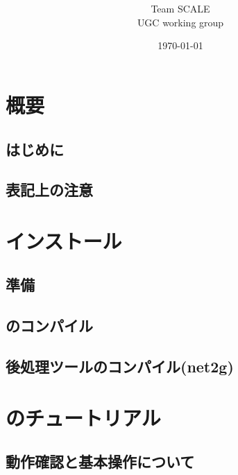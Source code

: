 \documentclass[a4paper]{jreport}
\title{{\vspace{2cm}{\Large Version \version} }}
\author{\Large Team SCALE\\ UGC working group}
\date{\today}
\begin{document}
\maketitle
\ClearWallPaper
{}
\tableofcontents


\part{概要} \label{part:overview}
 \chapter{はじめに} \label{sec:introduction}
 
 \chapter{表記上の注意} \label{sec:notation}
 

\part{インストール} \label{part:install}
 \chapter{準備}
 
 \chapter{\scalelib のコンパイル}
 
 \chapter{後処理ツールのコンパイル(net2g)}
  

\part{\scalerm のチュートリアル}
\chapter{動作確認と基本操作について} \label{chap:tutorial_ideal}




\end{document}
